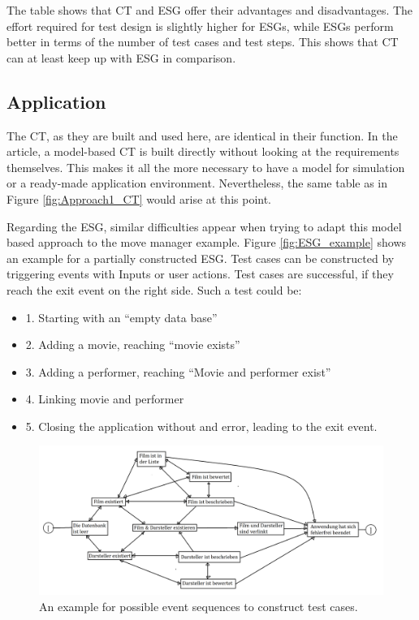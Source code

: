 The table shows that CT and ESG offer their advantages and disadvantages. The effort required for test design is slightly higher for ESGs, while ESGs perform better in terms of the number of test cases and test steps. This shows that CT can at least keep up with ESG in comparison.

\subsection{Application}

The CT, as they are built and used here, are identical in their function. In the article, a model-based CT is built directly without looking at the requirements themselves. This makes it all the more necessary to have a model for simulation or a ready-made application environment. Nevertheless, the same table as in Figure \autoref{fig:Approach1_CT} would arise at this point.

Regarding the ESG, similar difficulties appear when trying to adapt this model based approach to the move manager example. Figure \autoref{fig:ESG_example} shows an example for a partially constructed ESG. Test cases can be constructed by triggering events with Inputs or user actions. Test cases are successful, if they reach the exit event on the right side. Such a test could be: 

\begin{itemize}
	\item 1. Starting with an \enquote{empty data base}
	\item 2. Adding a movie, reaching \enquote{movie exists}
	\item 3. Adding a performer, reaching \enquote{Movie and performer exist}
	\item 4. Linking movie and performer
	\item 5. Closing the application without and error, leading to the exit event.
\end{itemize}

\begin{figure}[H]
\centering
\includegraphics[scale=0.175]{../../individual/groeger/images/ESGamBeispiel.png} 
\caption{An example for possible event sequences to construct test cases.}
\label{fig:ESG_example}
\end{figure}

